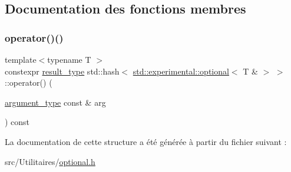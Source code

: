 \subsection{Documentation des fonctions membres}
\mbox{\label{structstd_1_1hash_3_01std_1_1experimental_1_1optional_3_01_t_01_6_01_4_01_4_a7d500e8beb4c7420f49f73ffd68e0fac}} 
\subsubsection{\texorpdfstring{operator()()}{operator()()}}
{\footnotesize\ttfamily template$<$typename T $>$ \\
constexpr \hyperlink{structstd_1_1hash_3_01std_1_1experimental_1_1optional_3_01_t_01_6_01_4_01_4_acfb996ccc0604598b856ff0b73abf1a0}{result\+\_\+type} std\+::hash$<$ \hyperlink{classstd_1_1experimental_1_1optional}{std\+::experimental\+::optional}$<$ T \& $>$ $>$\+::operator() (\begin{DoxyParamCaption}\item[{\hyperlink{structstd_1_1hash_3_01std_1_1experimental_1_1optional_3_01_t_01_6_01_4_01_4_ab5e4cdb491b0c3833fa266cdf95a26f8}{argument\+\_\+type} const \&}]{arg }\end{DoxyParamCaption}) const\hspace{0.3cm}{\ttfamily [inline]}}



La documentation de cette structure a été générée à partir du fichier suivant \+:\begin{DoxyCompactItemize}
\item 
src/\+Utilitaires/\hyperlink{optional_8h}{optional.\+h}\end{DoxyCompactItemize}
